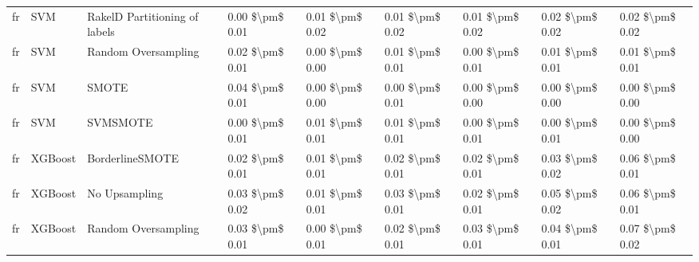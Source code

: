 \begin{tabular}{lllllllll}
      fr &                             SVM & RakelD Partitioning of labels & 0.00 \$\textbackslash pm\$ 0.01 &           0.01 \$\textbackslash pm\$ 0.02 &       0.01 \$\textbackslash pm\$ 0.02 &        0.01 \$\textbackslash pm\$ 0.02 &                         0.02 \$\textbackslash pm\$ 0.02 &     0.02 \$\textbackslash pm\$ 0.02 \\
      fr &                             SVM &           Random Oversampling & 0.02 \$\textbackslash pm\$ 0.01 &           0.00 \$\textbackslash pm\$ 0.00 &       0.01 \$\textbackslash pm\$ 0.01 &        0.00 \$\textbackslash pm\$ 0.01 &                         0.01 \$\textbackslash pm\$ 0.01 &     0.01 \$\textbackslash pm\$ 0.01 \\
      fr &                             SVM &                         SMOTE & 0.04 \$\textbackslash pm\$ 0.01 &           0.00 \$\textbackslash pm\$ 0.00 &       0.00 \$\textbackslash pm\$ 0.01 &        0.00 \$\textbackslash pm\$ 0.00 &                         0.00 \$\textbackslash pm\$ 0.00 &     0.00 \$\textbackslash pm\$ 0.00 \\
      fr &                             SVM &                      SVMSMOTE & 0.00 \$\textbackslash pm\$ 0.01 &           0.01 \$\textbackslash pm\$ 0.01 &       0.01 \$\textbackslash pm\$ 0.01 &        0.00 \$\textbackslash pm\$ 0.01 &                         0.00 \$\textbackslash pm\$ 0.01 &     0.00 \$\textbackslash pm\$ 0.00 \\
      fr &                         XGBoost &               BorderlineSMOTE & 0.02 \$\textbackslash pm\$ 0.01 &           0.01 \$\textbackslash pm\$ 0.01 &       0.02 \$\textbackslash pm\$ 0.01 &        0.02 \$\textbackslash pm\$ 0.01 &                         0.03 \$\textbackslash pm\$ 0.02 &     0.06 \$\textbackslash pm\$ 0.01 \\
      fr &                         XGBoost &                 No Upsampling & 0.03 \$\textbackslash pm\$ 0.02 &           0.01 \$\textbackslash pm\$ 0.01 &       0.03 \$\textbackslash pm\$ 0.01 &        0.02 \$\textbackslash pm\$ 0.01 &                         0.05 \$\textbackslash pm\$ 0.02 &     0.06 \$\textbackslash pm\$ 0.01 \\
      fr &                         XGBoost &           Random Oversampling & 0.03 \$\textbackslash pm\$ 0.01 &           0.00 \$\textbackslash pm\$ 0.01 &       0.02 \$\textbackslash pm\$ 0.01 &        0.03 \$\textbackslash pm\$ 0.01 &                         0.04 \$\textbackslash pm\$ 0.01 &     0.07 \$\textbackslash pm\$ 0.02 \\

\end{tabular}
